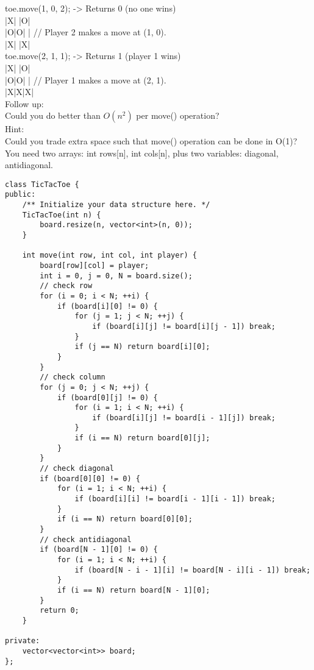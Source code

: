 toe.move(1, 0, 2); -> Returns 0 (no one wins)\\
|X| |O|\\
|O|O| | // Player 2 makes a move at (1, 0).\\
|X| |X|\\

toe.move(2, 1, 1); -> Returns 1 (player 1 wins)\\
|X| |O|\\
|O|O| | // Player 1 makes a move at (2, 1).\\
|X|X|X|\\

Follow up:\\
Could you do better than $O(n^2)$ per move() operation?\\

Hint:\\
Could you trade extra space such that move() operation can be done in O(1)? You need two arrays: int rows[n], int cols[n], plus two variables: diagonal, antidiagonal. \\

\begin{lstlisting}
class TicTacToe {
public:
    /** Initialize your data structure here. */
    TicTacToe(int n) {
        board.resize(n, vector<int>(n, 0));   
    }

    int move(int row, int col, int player) {
        board[row][col] = player;
        int i = 0, j = 0, N = board.size();
        // check row
        for (i = 0; i < N; ++i) {
            if (board[i][0] != 0) {
                for (j = 1; j < N; ++j) {
                    if (board[i][j] != board[i][j - 1]) break;
                }
                if (j == N) return board[i][0];
            }
        }
        // check column
        for (j = 0; j < N; ++j) {
            if (board[0][j] != 0) {
                for (i = 1; i < N; ++i) {
                    if (board[i][j] != board[i - 1][j]) break;
                }
                if (i == N) return board[0][j];
            }
        }
        // check diagonal
        if (board[0][0] != 0) {
            for (i = 1; i < N; ++i) {
                if (board[i][i] != board[i - 1][i - 1]) break;
            }
            if (i == N) return board[0][0];
        }
        // check antidiagonal
        if (board[N - 1][0] != 0) {
            for (i = 1; i < N; ++i) {
                if (board[N - i - 1][i] != board[N - i][i - 1]) break;
            }
            if (i == N) return board[N - 1][0];
        }
        return 0;
    }
    
private:
    vector<vector<int>> board;
};
\end{lstlisting}


